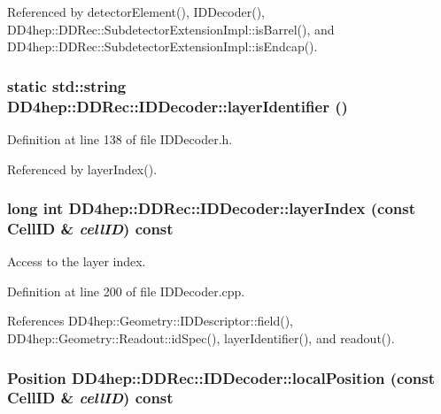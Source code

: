 Referenced by detectorElement(), IDDecoder(), DD4hep::DDRec::SubdetectorExtensionImpl::isBarrel(), and DD4hep::DDRec::SubdetectorExtensionImpl::isEndcap().\hypertarget{class_d_d4hep_1_1_d_d_rec_1_1_i_d_decoder_a0eb172032d0261f4d8897f705ed94cee}{
\subsubsection[{layerIdentifier}]{\setlength{\rightskip}{0pt plus 5cm}static std::string DD4hep::DDRec::IDDecoder::layerIdentifier ()}}
\label{class_d_d4hep_1_1_d_d_rec_1_1_i_d_decoder_a0eb172032d0261f4d8897f705ed94cee}


Definition at line 138 of file IDDecoder.h.

Referenced by layerIndex().\hypertarget{class_d_d4hep_1_1_d_d_rec_1_1_i_d_decoder_a97d36fafaecff5fd10580d86bbafd510}{
\subsubsection[{layerIndex}]{\setlength{\rightskip}{0pt plus 5cm}long int DD4hep::DDRec::IDDecoder::layerIndex (const {\bf CellID} \& {\em cellID}) const}}
\label{class_d_d4hep_1_1_d_d_rec_1_1_i_d_decoder_a97d36fafaecff5fd10580d86bbafd510}


Access to the layer index. 

Definition at line 200 of file IDDecoder.cpp.

References DD4hep::Geometry::IDDescriptor::field(), DD4hep::Geometry::Readout::idSpec(), layerIdentifier(), and readout().\hypertarget{class_d_d4hep_1_1_d_d_rec_1_1_i_d_decoder_a60e6cafbb3f3e57f6d041b2d17f1c92e}{
\subsubsection[{localPosition}]{\setlength{\rightskip}{0pt plus 5cm}Position DD4hep::DDRec::IDDecoder::localPosition (const {\bf CellID} \& {\em cellID}) const}}
\label{class_d_d4hep_1_1_d_d_rec_1_1_i_d_decoder_a60e6cafbb3f3e57f6d041b2d17f1c92e}


